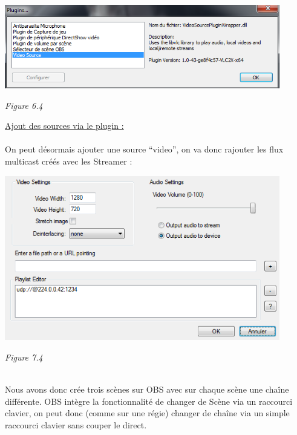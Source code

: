 \documentclass{report}
\begin{document}
   \begin{center}
    \includegraphics[width=12cm]{img/plugin2.png}
    
    \textit{\small{Figure 6.4}}
    \end{center}

    
    \underline{Ajout des sources via le plugin :}
    \\
    \\
    On peut désormais ajouter une source “video”, on va donc rajouter les flux multicast créés avec les Streamer :
    \\

    \begin{center}
    \includegraphics[width=12cm]{img/plugin.png}
    
    \textit{\small{Figure 7.4}}
    \end{center}

    \\
    Nous avons donc crée trois scènes sur OBS avec sur chaque scène une chaîne différente. OBS intègre la fonctionnalité de changer de Scène via un raccourci clavier, on peut donc (comme sur une régie) changer de chaîne via un simple raccourci clavier sans couper le direct.
    \\
    \\
    
\end{document}
